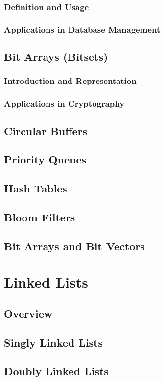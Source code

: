 \documentclass[12pt, oneside]{book}
\begin{document}
	\subsection{Definition and Usage}
	\subsection{Applications in Database Management}
	
	\section{Bit Arrays (Bitsets)}
	\subsection{Introduction and Representation}
	\subsection{Applications in Cryptography}
	\section{Circular Buffers}
	\section{Priority Queues}
	\section{Hash Tables}
	\section{Bloom Filters}
	\section{Bit Arrays and Bit Vectors}
	
\chapter{Linked Lists}
\section{Overview}
\section{Singly Linked Lists}
\section{Doubly Linked Lists}
\end{document}
